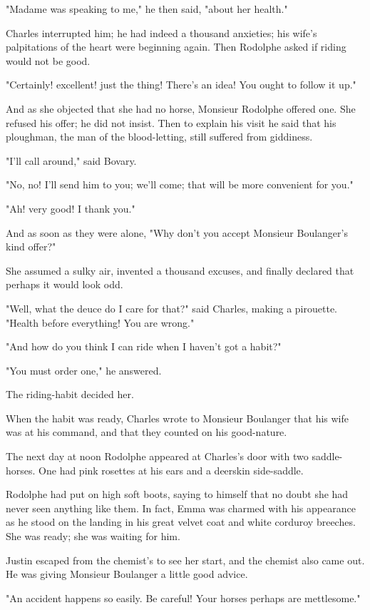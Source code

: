 \documentclass{tufte-book}
\begin{document}
"Madame was speaking to me," he then said, "about her health."

Charles interrupted him; he had indeed a thousand anxieties; his wife's
palpitations of the heart were beginning again. Then Rodolphe asked if
riding would not be good.

"Certainly! excellent! just the thing! There's an idea! You ought to
follow it up."

And as she objected that she had no horse, Monsieur Rodolphe offered
one. She refused his offer; he did not insist. Then to explain his visit
he said that his ploughman, the man of the blood-letting, still suffered
from giddiness.

"I'll call around," said Bovary.

"No, no! I'll send him to you; we'll come; that will be more convenient
for you."

"Ah! very good! I thank you."

And as soon as they were alone, "Why don't you accept Monsieur
Boulanger's kind offer?"

She assumed a sulky air, invented a thousand excuses, and finally
declared that perhaps it would look odd.

"Well, what the deuce do I care for that?" said Charles, making a
pirouette. "Health before everything! You are wrong."

"And how do you think I can ride when I haven't got a habit?"

"You must order one," he answered.

The riding-habit decided her.

When the habit was ready, Charles wrote to Monsieur Boulanger that his
wife was at his command, and that they counted on his good-nature.

The next day at noon Rodolphe appeared at Charles's door with two
saddle-horses. One had pink rosettes at his ears and a deerskin
side-saddle.

Rodolphe had put on high soft boots, saying to himself that no doubt she
had never seen anything like them. In fact, Emma was charmed with his
appearance as he stood on the landing in his great velvet coat and white
corduroy breeches. She was ready; she was waiting for him.

Justin escaped from the chemist's to see her start, and the chemist also
came out. He was giving Monsieur Boulanger a little good advice.

"An accident happens so easily. Be careful! Your horses perhaps are
mettlesome."
\end{document}
